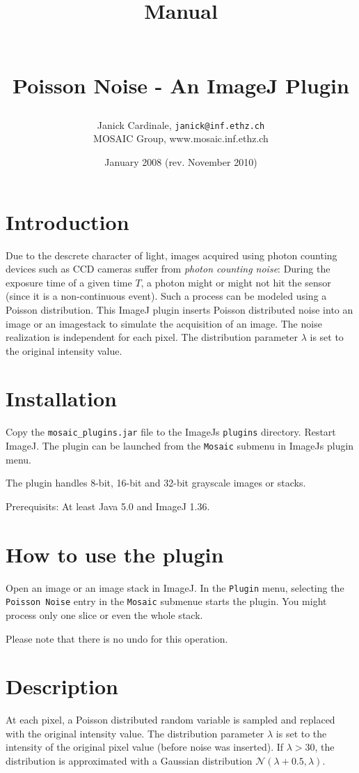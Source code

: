 \documentclass{scrartcl}
\title{\begin{small}Manual\end{small}\\Poisson Noise - An ImageJ Plugin}
\date{January 2008 (rev. November 2010)}
\author{Janick Cardinale, \texttt{janick@inf.ethz.ch}\\MOSAIC Group, www.mosaic.inf.ethz.ch}
\begin{document}
\maketitle

\section{Introduction}
\label{sec:intro}
Due to the descrete character of light, images acquired using photon counting devices such as CCD cameras suffer from \textit{photon counting noise}: During the exposure time of a given time $T$, a photon might or might not hit the sensor (since it is a non-continuous event). Such a process can be modeled using a Poisson distribution.  
This ImageJ plugin inserts Poisson distributed noise into an image or an imagestack to simulate the acquisition of an image. The noise realization is independent for each pixel. The distribution parameter $\lambda$ is set to the original intensity value.

\section{Installation}
Copy the \texttt{mosaic\_plugins.jar} file to the ImageJs \texttt{plugins} directory. Restart ImageJ. The plugin can be launched from the \texttt{Mosaic} submenu in ImageJs plugin menu. 

The plugin handles 8-bit, 16-bit and 32-bit grayscale images or stacks. 

Prerequisits: At least Java 5.0 and ImageJ 1.36.

\section{How to use the plugin}
Open an image or an image stack in ImageJ. In the \texttt{Plugin} menu, selecting the \texttt{Poisson Noise} entry in the \texttt{Mosaic} submenue starts the plugin. You might process only one slice or even the whole stack.

Please note that there is no undo for this operation.

\section{Description}
At each pixel, a Poisson distributed random variable is sampled and replaced with the original intensity value. The distribution parameter $\lambda$ is set to the intensity of the original pixel value (before noise was inserted). If $\lambda > 30$, the distribution is approximated with a Gaussian distribution $\mathcal{N}(\lambda + 0.5,\lambda)$. 
\end{document}
